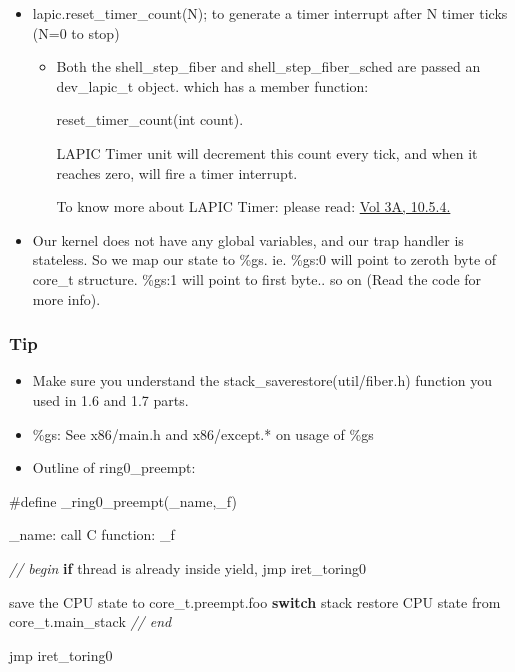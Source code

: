 \documentclass[]{book}
\newenvironment{Shaded}{}{}
\newcommand{\KeywordTok}[1]{\textbf{{#1}}}
\newcommand{\DataTypeTok}[1]{\textcolor[rgb]{0.50,0.00,0.00}{{#1}}}
\newcommand{\CommentTok}[1]{\textcolor[rgb]{0.50,0.50,0.50}{\textit{{#1}}}}
\newcommand{\OtherTok}[1]{{#1}}
\newcommand{\NormalTok}[1]{{#1}}
\begin{document}
\begin{itemize}
\itemsep1pt\parskip0pt
\item
  lapic.reset\_timer\_count(N); to generate a timer interrupt after N
  timer ticks (N=0 to stop)

  \begin{itemize}
  \item
    Both the shell\_step\_fiber and shell\_step\_fiber\_sched are passed
    an dev\_lapic\_t object. which has a member function:

\begin{Shaded}
\begin{Highlighting}[]
\NormalTok{reset_timer_count(}\DataTypeTok{int} \NormalTok{count).}
\end{Highlighting}
\end{Shaded}

    LAPIC Timer unit will decrement this count every tick, and when it
    reaches zero, will fire a timer interrupt.

    To know more about LAPIC Timer: please read:
    \href{http://www.cse.iitd.ac.in/~deepak/hohlabs/intel.pdf}{Vol 3A,
    10.5.4.}
  \end{itemize}
\item
  Our kernel does not have any global variables, and our trap handler is
  stateless. So we map our state to \%gs. ie. \%gs:0 will point to
  zeroth byte of core\_t structure. \%gs:1 will point to first byte.. so
  on (Read the code for more info).
\end{itemize}

\subsubsection*{Tip}\label{tip-7}

\begin{itemize}
\item
  Make sure you understand the stack\_saverestore(util/fiber.h) function
  you used in 1.6 and 1.7 parts.
\item
  \%gs: See x86/main.h and x86/except.* on usage of \%gs
\item
  Outline of ring0\_preempt:
\end{itemize}

\begin{Shaded}
\begin{Highlighting}[]

   \OtherTok{#define _ring0_preempt(_name,_f)}

   \NormalTok{_name:}
         \NormalTok{call C function: _f}

         \CommentTok{// begin}
         \KeywordTok{if} \NormalTok{thread is already inside yield,}
           \NormalTok{jmp iret_toring0}

         \NormalTok{save the CPU state to core_t.preempt.foo}
         \KeywordTok{switch} \NormalTok{stack}
         \NormalTok{restore CPU state from core_t.main_stack}
         \CommentTok{// end}

         \NormalTok{jmp iret_toring0}
\end{Highlighting}
\end{Shaded}
\end{document}
